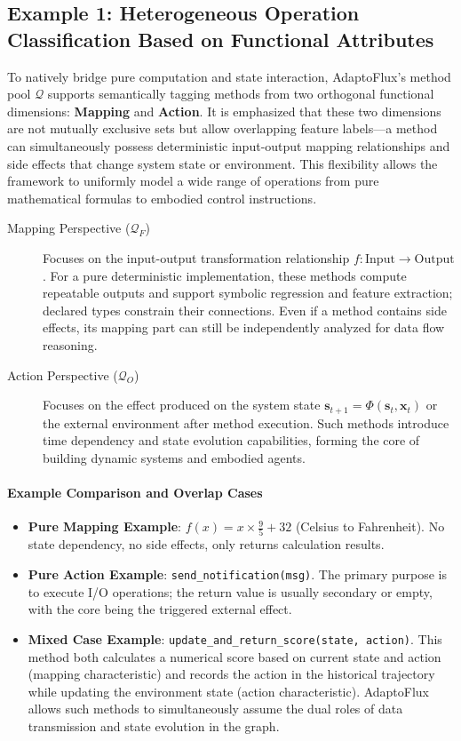 \subsection{Example 1: Heterogeneous Operation Classification Based on Functional Attributes}

To natively bridge pure computation and state interaction, AdaptoFlux's method pool $\mathcal{Q}$ supports semantically tagging methods from two orthogonal functional dimensions: \textbf{Mapping} and \textbf{Action}. It is emphasized that these two dimensions are not mutually exclusive sets but allow overlapping feature labels---a method can simultaneously possess deterministic input-output mapping relationships and side effects that change system state or environment. This flexibility allows the framework to uniformly model a wide range of operations from pure mathematical formulas to embodied control instructions.

\begin{description}
    \item[Mapping Perspective ($\mathcal{Q}_F$)] Focuses on the input-output transformation relationship $f: \text{Input} \to \text{Output}$. For a pure deterministic implementation, these methods compute repeatable outputs and support symbolic regression and feature extraction; declared types constrain their connections. Even if a method contains side effects, its mapping part can still be independently analyzed for data flow reasoning.
    \item[Action Perspective ($\mathcal{Q}_O$)] Focuses on the effect produced on the system state $\mathbf{s}_{t+1} = \Phi(\mathbf{s}_t, \mathbf{x}_t)$ or the external environment after method execution. Such methods introduce time dependency and state evolution capabilities, forming the core of building dynamic systems and embodied agents.
\end{description}

\paragraph{Example Comparison and Overlap Cases}
\begin{itemize}
    \item \textbf{Pure Mapping Example}: $f(x) = x \times \frac{9}{5} + 32$ (Celsius to Fahrenheit). No state dependency, no side effects, only returns calculation results.
    \item \textbf{Pure Action Example}: \texttt{send\_notification(msg)}. The primary purpose is to execute I/O operations; the return value is usually secondary or empty, with the core being the triggered external effect.
    \item \textbf{Mixed Case Example}: \texttt{update\_and\_return\_score(state, action)}. This method both calculates a numerical score based on current state and action (mapping characteristic) and records the action in the historical trajectory while updating the environment state (action characteristic). AdaptoFlux allows such methods to simultaneously assume the dual roles of data transmission and state evolution in the graph.
\end{itemize}

